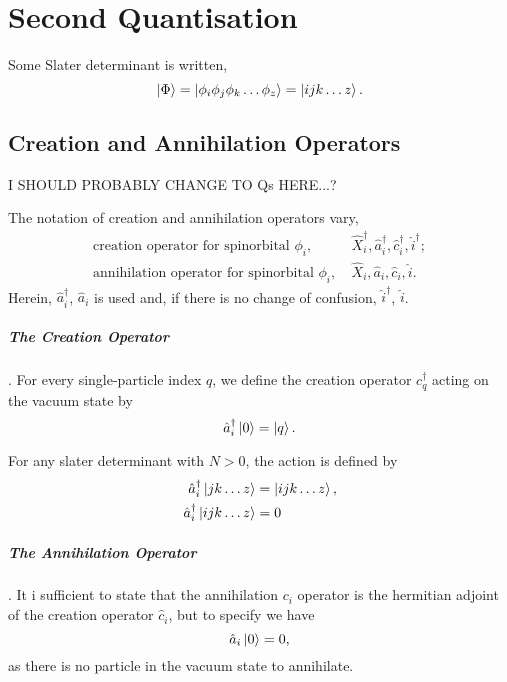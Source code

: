 \chapter{Second Quantisation}

Some Slater determinant is written,
\begin{equation}
    \ket{\Phi} = \ket{\phi_i \phi_j \phi_k \dots \phi_z} = \ket{ijk \dots z}.
\end{equation}

\section{Creation and Annihilation Operators}

    I SHOULD PROBABLY CHANGE TO Qs HERE...?

    The notation of creation and annihilation operators vary,
    \begin{align*}
        \text{creation operator for spinorbital } \phi_i, &\ 
        \hat{X}_i^\dagger, \hat{a}^\dagger_i, \hat{c}_i^\dagger, \hat{i}^\dagger; \\
        \text{annihilation operator for spinorbital } \phi_i, &\ 
        \hat{X}_i, \hat{a}_i, \hat{c}_i, \hat{i}.       
    \end{align*}
    Herein, $\hat{a}_i^\dagger$, $\hat{a}_i$ is used and, if there is no change of 
    confusion, $\hat{i}^\dagger$, $\hat{i}$.

    \paragraph{The Creation Operator}. For every single-particle index $q$,
    we define the creation operator
    $c_q^\dagger$ acting on the vacuum state by
    \begin{equation}
        \hat{a}_i^\dagger \ket{0} = \ket{q}.
    \end{equation}

    For any slater determinant with $N > 0$, the action is defined by
    \begin{align}
        \hat{a}_i^\dagger\ket{jk \dots z} &= \ket{ijk \dots z}, \\
        \hat{a}_i^\dagger\ket{ijk \dots z} &= 0
    \end{align}

    \paragraph{The Annihilation Operator}. It i sufficient to state that the 
    annihilation $c_i$ operator is the hermitian adjoint of the creation operator
    $\hat{c}_i$, but to specify we have
    \begin{equation}
        \hat{a}_i\ket{0} = 0,
    \end{equation}
    as there is no particle in the vacuum state to annihilate. 

